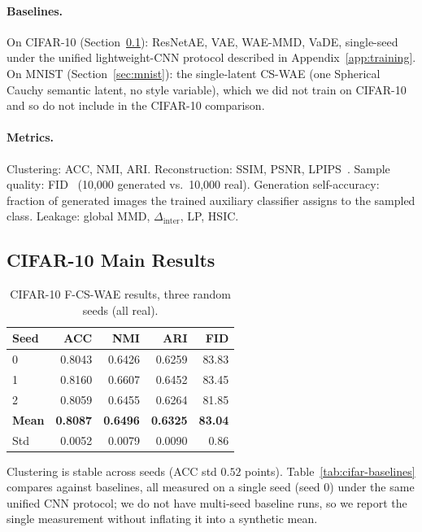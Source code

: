 \documentclass[10pt,letterpaper]{article}
\newcommand{\ours}{F-CS-WAE}
\newcommand{\simple}{CS-WAE}
\begin{document}
\paragraph{Baselines.} On CIFAR-10 (Section~\ref{sec:cifar10}): ResNetAE,
VAE, WAE-MMD, VaDE, single-seed under the unified lightweight-CNN protocol
described in Appendix~\ref{app:training}. On MNIST
(Section~\ref{sec:mnist}): the single-latent \simple{} (one Spherical Cauchy
semantic latent, no style variable), which we did not train on CIFAR-10 and
so do not include in the CIFAR-10 comparison.

\paragraph{Metrics.} Clustering: ACC, NMI, ARI. Reconstruction: SSIM, PSNR,
LPIPS~\citep{zhang2018unreasonable}. Sample quality:
FID~\citep{heusel2017gans} (10,000 generated vs.\ 10,000 real). Generation
self-accuracy: fraction of generated images the trained auxiliary classifier
assigns to the sampled class. Leakage: global MMD, $\Delta_{\mathrm{inter}}$,
LP, HSIC.

\subsection{CIFAR-10 Main Results}
\label{sec:cifar10}

\begin{table}[t]
\centering
\small
\caption{CIFAR-10 \ours{} results, three random seeds (all real).}
\label{tab:cifar-main}
\begin{tabular}{lrrrr}
\toprule
Seed & ACC & NMI & ARI & FID \\
\midrule
0 & 0.8043 & 0.6426 & 0.6259 & 83.83 \\
1 & 0.8160 & 0.6607 & 0.6452 & 83.45 \\
2 & 0.8059 & 0.6455 & 0.6264 & 81.85 \\
\midrule
\textbf{Mean} & \textbf{0.8087} & \textbf{0.6496} & \textbf{0.6325} & \textbf{83.04} \\
Std           & 0.0052 & 0.0079 & 0.0090 & 0.86 \\
\bottomrule
\end{tabular}
\end{table}

Clustering is stable across seeds (ACC std $0.52$ points).
Table~\ref{tab:cifar-baselines} compares against baselines, all measured on
a single seed (seed 0) under the same unified CNN protocol; we do not have
multi-seed baseline runs, so we report the single measurement without
inflating it into a synthetic mean.
\end{document}
